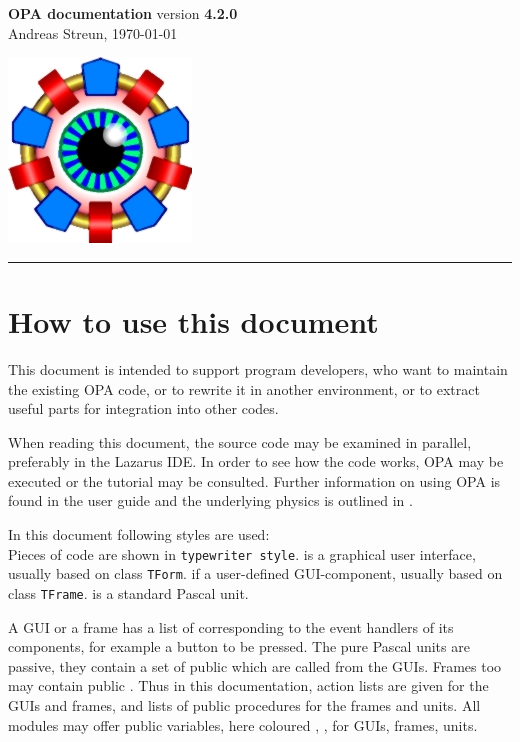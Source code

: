 \documentclass[12pt]{article}
\newcommand\code[1]{{\tt #1}}
\newcommand\guico[1]{{\color{blue}\code{#1}}}
\newcommand\guifco[1]{{\color{violet}\code{#1}}}
\newcommand{\unico}[1]{{\color{burntorange}\code{#1}}}
\newcommand{\opagui}[1]{\colorbox{blue!20}{{\color{black}\code{#1}}}}
\newcommand{\opaguif}[1]{\colorbox{violet!30}{{\color{black}\code{#1}}}}
\newcommand{\opauni}[1]{\colorbox{orange!30}{{\color{black}\code{#1}}}}
\begin{document}
\noindent
{}

\parbox[t]{0.7\hsize}{
  {\Huge\bf OPA documentation} version {\bf 4.2.0}\\
  Andreas Streun, \today
} \hfill  \includegraphics{opalogo_small.jpg}
\rule{\hsize}{1pt}

\section{How to use this document}
This document is intended to support program developers, who want to maintain the existing OPA code, or to rewrite it in another environment, or to extract useful parts for integration into other codes.

When reading this document, the source code may be examined in parallel, preferably in the Lazarus IDE. In order to see how the code works, OPA may be executed or the tutorial \cite{tutorial} may be consulted. Further information on using OPA is found in the user guide \cite{userguide} and the underlying physics is outlined in \cite{inside}.

In this document following styles are used:\\
Pieces of code are shown in \code{typewriter style}.
\opagui{GUI} is a graphical user interface, usually based on class \code{TForm}. \opaguif{Frame} if a user-defined GUI-component, usually based on class \code{TFrame}.  \opauni{Unit} is a standard Pascal unit. 

A GUI or a frame has a list of \guico{actions} corresponding to the event handlers of its components, for example a button to be pressed. The pure Pascal units are passive, they contain a set of public \unico{procedures} which are called from the GUIs. Frames too may contain public \guifco{procedures}. Thus in this documentation, action lists are given for the GUIs and frames, and lists of public procedures for the frames and units. All modules may offer public variables, here coloured \guico{x}, \guifco{y}, \unico{z} for GUIs, frames, units.
\end{document}
